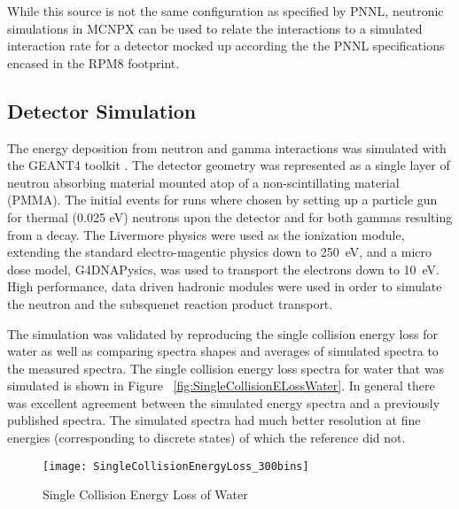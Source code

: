 \documentclass[draftcls,onecolumn]{IEEEtran}
\begin{document}
While this source is not the same configuration as specified by PNNL, neutronic simulations in MCNPX can be used to relate the interactions to a simulated interaction rate for a detector mocked up according the the PNNL specifications encased in the RPM8 footprint.

\subsection{Detector Simulation}
The energy deposition from neutron and gamma interactions was simulated with the GEANT4 toolkit \cite{agostinelli_geatn4simulation_2003}.
The detector geometry was represented as a single layer of neutron absorbing material mounted atop of a non-scintillating material (PMMA).
The initial events for runs where chosen by setting up a particle gun for thermal (0.025 eV) neutrons upon the detector and for both gammas resulting from a  decay.
The Livermore physics were used as the ionization module, extending the standard electro-magentic physics down to \SI{250}{\eV}, and a micro dose model, G4DNAPysics, was used to transport the electrons down to \SI{10}{\eV}.
High performance, data driven hadronic modules were used in order to simulate the neutron and the subsquenet reaction product transport.

The simulation was validated by reproducing the single collision energy loss for water as well as comparing spectra shapes and averages of simulated spectra to the measured spectra.
The single collision energy loss spectra for water that was simulated is shown in Figure ~\ref{fig:SingleCollisionELossWater}.
In general there was excellent agreement between the simulated energy spectra and a previously published spectra\cite{turner_comparative_1982}.
The simulated spectra had much better resolution at fine energies (corresponding to discrete states) of which the reference did not.
\begin{figure}[h]
    \centering
    \texttt{[image: SingleCollisionEnergyLoss\_300bins]}
    \caption{Single Collision Energy Loss of Water}
	\label{fig:SingleCollsionELossWater}
\end{figure}

\end{document}
